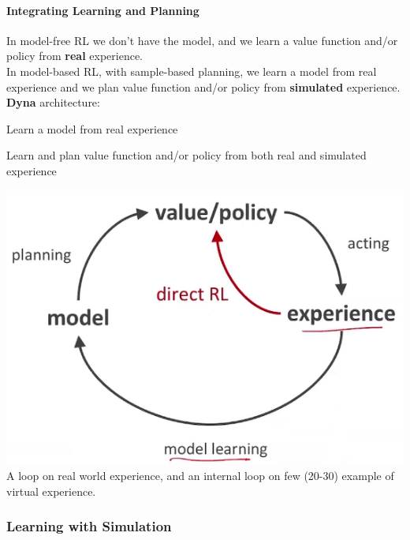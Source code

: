 \documentclass[10pt]{report}
\begin{document}
\paragraph{Integrating Learning and Planning} In model-free RL we don't have the model, and we learn a value function and/or policy from \textbf{real} experience.\\
In model-based RL, with sample-based planning, we learn a model from real experience and we plan value function and/or policy from \textbf{simulated} experience.\\
\textbf{Dyna} architecture:
\begin{list}{}{}
	\item Learn a model from real experience
	\item Learn and plan value function and/or policy from both real and simulated experience
\end{list}
\begin{center}
	\includegraphics[scale=0.5]{185.png}\\
A loop on real world experience, and an internal loop on few (20-30) example of virtual experience.
\end{center}
\subsubsection{Learning with Simulation}
\end{document}
